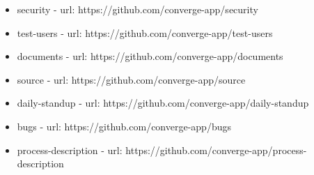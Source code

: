 \begin{itemize}
  \item security - url: https://github.com/converge-app/security
  \item test-users - url: https://github.com/converge-app/test-users
  \item documents - url: https://github.com/converge-app/documents
  \item source - url: https://github.com/converge-app/source
  \item daily-standup - url: https://github.com/converge-app/daily-standup
  \item bugs - url: https://github.com/converge-app/bugs
  \item process-description - url: https://github.com/converge-app/process-description
\end{itemize}

